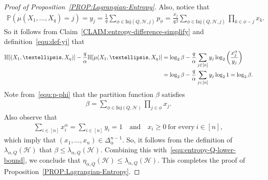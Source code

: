 \documentclass[10pt,a4paper]{amsart}
\begin{document}
\begin{proof}[Proof of Proposition~\ref{PROP:Lagrangian-Entropy}]
    Also, notice that 
    \begin{align*}
        \mathbb{P}\left(\mu(X_1, \ldots, X_q) = j \right) 
        = y_j 
        = \frac{1}{q}\sum_{\phi \in \mathrm{Inj}(Q,\mathcal{H}, j)}p_{\phi}
        = \frac{x_j}{q \beta}  \sum_{\phi \in \mathrm{Inj}(Q,\mathcal{H}, j)} \prod_{k \in \phi - j} x_k.
    \end{align*}
    So it follows from Claim~\ref{CLAIM:entropy-difference-simplify} and definition~\eqref{equ:def-yj} that 
    \begin{align}\label{equ:entropy-Q-lower-bound}
        \mathbb{H}[(X_1, \ldots, X_{q})] - \frac{q}{\alpha} \mathbb{H}[\mu(X_1, \ldots, X_q)] 
        & = \log_{2} \beta - \frac{q}{\alpha} \sum_{j \in [n]} y_j \log_{2}\left(\frac{x_j^{\alpha}}{y_j}\right) \notag \\
        & = \log_{2} \beta - \frac{q}{\alpha} \sum_{j \in [n]} y_j \log_{2} 1
        = \log_{2} \beta.  
    \end{align}
    Note from~\eqref{equ:p-phi} that the partition function $\beta$ satisfies 
    \begin{align*}
        \beta 
        = \sum_{\phi \in \mathrm{Inj}(Q, \mathcal{H})} \prod_{j \in \phi} x_j. 
    \end{align*}
    Also observe that  
    \begin{align*}
        \sum_{i\in [n]} x_i^{\alpha} = \sum_{i \in [n]} y_i = 1
        \quad\text{and}\quad 
        x_i \ge 0 ~\text{for every}~ i \in [n], 
    \end{align*}
    which imply that $(x_1, \ldots, x_n) \in \Delta_{\alpha}^{n-1}$. 
    So, it follows from the definition of $\lambda_{\alpha, Q}(\mathcal{H})$ that $\beta \le \lambda_{\alpha, Q}(\mathcal{H})$. 
    Combining this with~\eqref{equ:entropy-Q-lower-bound}, we conclude that $\eta_{\alpha, Q}(\mathcal{H}) \le \lambda_{\alpha, Q}(\mathcal{H})$. 
    This completes the proof of Proposition~\ref{PROP:Lagrangian-Entropy}. 
\end{proof}%
\end{document}
